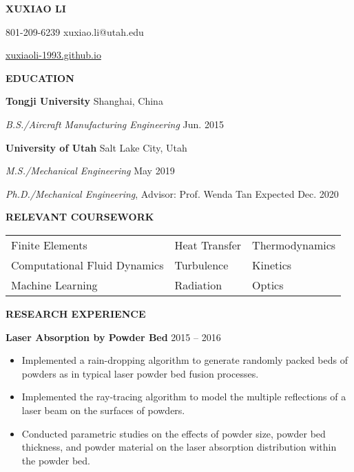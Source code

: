 \documentclass[12pt, letterpaper]{article}
\begin{document}
\begin{center}
   \textbf{\large XUXIAO LI}

   801-209-6239 \textbar{} xuxiao.li@utah.edu

   \href{xuxiaoli-1993.github.io}{xuxiaoli-1993.github.io}
   \paraspace
\end{center}

\textbf{EDUCATION}

\fullrule

\textbf{Tongji University} 
\hfill
Shanghai, China

\textit{B.S./Aircraft Manufacturing Engineering} \hfill Jun. 2015

\vspace{6pt}
\textbf{University of Utah} \hfill Salt Lake City, Utah

\textit{M.S./Mechanical Engineering} \hfill May 2019

\textit{Ph.D./Mechanical Engineering}, Advisor: Prof. Wenda Tan \hfill Expected Dec. 2020 
\vskip 11pt

\textbf{RELEVANT COURSEWORK}

\fullrule
\vspace{3pt}
\begin{tabular}{@{} p{} p{} p{} @{}}
   Finite Elements & Heat Transfer & Thermodynamics \\
   Computational Fluid Dynamics & Turbulence & Kinetics \\
   Machine Learning & Radiation & Optics
\end{tabular}
\vspace{9pt}

\textbf{RESEARCH EXPERIENCE}

\fullrule
\textbf{Laser Absorption by Powder Bed} \hfill 2015 -- 2016
\begin{itemize}[leftmargin=*, labelsep=5mm]
   \item Implemented a rain-dropping algorithm to generate randomly packed beds of powders as in
      typical laser powder bed fusion processes.
   \item Implemented the ray-tracing algorithm to model the multiple reflections of a laser beam on
      the surfaces of powders.
   \item Conducted parametric studies on the effects of powder size, powder bed thickness, and powder
      material on the laser absorption distribution within the powder bed.
\end{itemize}

\vspace{3pt}
\end{document}
